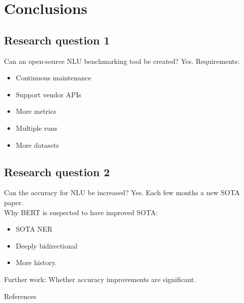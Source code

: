 \documentclass[pdf]{beamer}
\begin{document}
    \section{Conclusions}
    \subsection{Research question 1}
    \begin{frame}{Can an open-source NLU benchmarking tool be created?}
        Yes.
        Requirements:
        \begin{itemize}
            \item Continuous maintenance
            \item Support vendor APIs
            \item More metrics
            \item Multiple runs
            \item More datasets
        \end{itemize}
    \end{frame}

    \subsection{Research question 2}
    \begin{frame}{Can the accuracy for NLU be increased?}
        Yes.
        Each few months a new SOTA paper.\\[5mm]

        Why BERT is suspected to have improved SOTA:
        \begin{itemize}
            \item SOTA NER
            \item Deeply bidirectional
            \item More history.\\[5mm]
        \end{itemize}

        Further work: Whether accuracy improvements are significant.
    \end{frame}

    \appendix %
    
   \begin{frame}[allowframebreaks]{References}
        \scriptsize
        
\end{frame}
\end{document}
